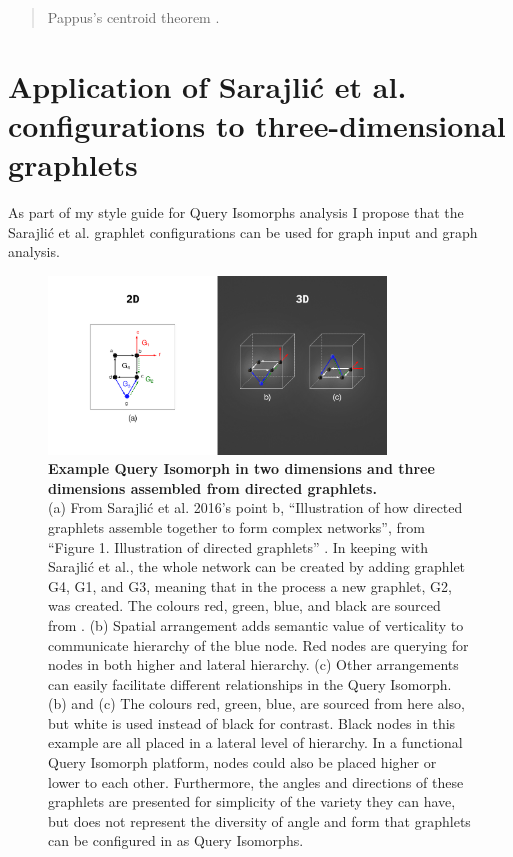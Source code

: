 \begin{quote}
    \centering *Pappus’s centroid theorem \citep{weisstein_torus_nodate}.
\end{quote}

\clearpage

\section{Application of Sarajlić et al. configurations to three-dimensional graphlets}
As part of my style guide for Query Isomorphs analysis I propose that the Sarajlić et al. graphlet configurations \citep[p. 3]{sarajlic_graphlet-based_2016} can be used for graph input and graph analysis.

\begin{figure}[h!]
    \centering
    \includegraphics[width=0.8\textwidth]{figures/5.6.png}
    \caption[Example Query Isomorph in two dimensions and three dimensions assembled from directed graphlets]{\textbf{Example Query Isomorph in two dimensions and three dimensions assembled from directed graphlets.} \\
(a) From Sarajlić et al. 2016’s point b, “Illustration of how directed graphlets assemble together to form complex networks”, from “Figure 1. Illustration of directed graphlets” \citep[p. 3]{sarajlic_graphlet-based_2016}. In keeping with Sarajlić et al., the whole network can be created by adding graphlet G4, G1, and G3, meaning that in the process a new graphlet, G2, was created. The colours red, green, blue, and black are sourced from \citep[p. 3]{sarajlic_graphlet-based_2016}. (b) Spatial arrangement adds semantic value of verticality to communicate hierarchy of the blue node.  Red nodes are querying for nodes in both higher and lateral hierarchy. (c) Other arrangements can easily facilitate different relationships in the Query Isomorph. (b) and (c) The colours red, green, blue, are sourced from \citep[p. 3]{sarajlic_graphlet-based_2016} here also, but white is used instead of black for contrast. Black nodes in this example are all placed in a lateral level of hierarchy. In a functional Query Isomorph platform, nodes could also be placed higher or lower to each other. Furthermore, the angles and directions of these graphlets are presented for simplicity of the variety they can have, but does not represent the diversity of angle and form that graphlets can be configured in as Query Isomorphs. 
}
    \label{f5.6}
\end{figure}
\clearpage


